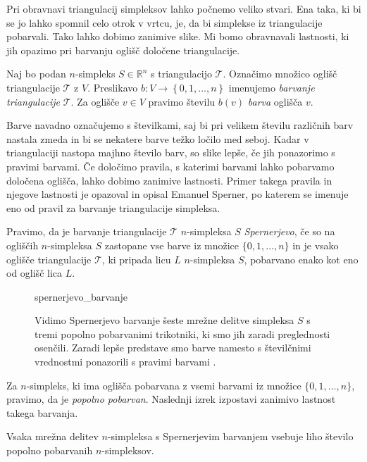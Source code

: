 \documentclass[mat1]{fmfdelo}
\newcommand{\R}{\mathbb R}
\newcommand{\0}{0}
\newcommand{\pT}{\mathcal T}
\begin{document}
Pri obravnavi triangulacij simpleksov lahko počnemo veliko stvari. Ena taka, ki bi se jo lahko spomnil celo otrok v vrtcu, je, da bi simplekse iz triangulacije pobarvali. Tako lahko dobimo zanimive slike. Mi bomo obravnavali lastnosti, ki jih opazimo pri barvanju oglišč določene triangulacije.
\begin{definicija}
Naj bo podan $n$-simpleks $S \in \R^n$ s triangulacijo $\pT$. Označimo množico oglišč triangulacije $\pT$ z $V$. Preslikavo $b : V \to \left \{0, 1, \dots, n \right \} $ imenujemo \emph{barvanje triangulacije} $\pT$. Za oglišče $v \in V$ pravimo številu $b(v)$ \emph{barva} oglišča $v$.
\end{definicija}
Barve navadno označujemo s številkami, saj bi pri velikem številu različnih barv nastala zmeda in bi se nekatere barve težko ločilo med seboj. Kadar v triangulaciji nastopa majhno število barv, so slike lepše, če jih ponazorimo s pravimi barvami. Če določimo pravila, s katerimi barvami lahko pobarvamo določena oglišča, lahko dobimo zanimive lastnosti. Primer takega pravila in njegove lastnosti je opazoval in opisal Emanuel Sperner, po katerem se imenuje eno od pravil za barvanje triangulacije simpleksa.
\begin{definicija}
Pravimo, da je barvanje triangulacije $\pT$ $n$-simpleksa $S$ \emph{Spernerjevo}, če so na ogliščih $n$-simpleksa $S$ zastopane vse barve iz množice $\{ 0, 1, \dots, n \}$ in je vsako oglišče triangulacije $\pT$, ki pripada licu $L$ $n$-simpleksa $S$, pobarvano enako kot eno od oglišč lica $L$.
\end{definicija}
\begin{figure}[h!]    
	\centering
		{spernerjevo_barvanje}
	\caption{Vidimo Spernerjevo barvanje šeste mrežne delitve simpleksa $S$ s tremi popolno pobarvanimi trikotniki, ki smo jih zaradi preglednosti osenčili. Zaradi lepše predstave smo barve namesto s številčnimi vrednostmi ponazorili s pravimi barvami .}
\end{figure}
Za $n$-simpleks, ki ima oglišča pobarvana z vsemi barvami iz množice $\{ 0, 1, \dots, n \}$, pravimo, da je \emph{popolno pobarvan}. Naslednji izrek izpostavi zanimivo lastnost takega barvanja.
\begin{lema}\label{izr:sperner}
Vsaka mrežna delitev $n$-simpleksa s Spernerjevim barvanjem vsebuje liho število popolno pobarvanih $n$-simpleksov.
\end{lema}
\end{document}
